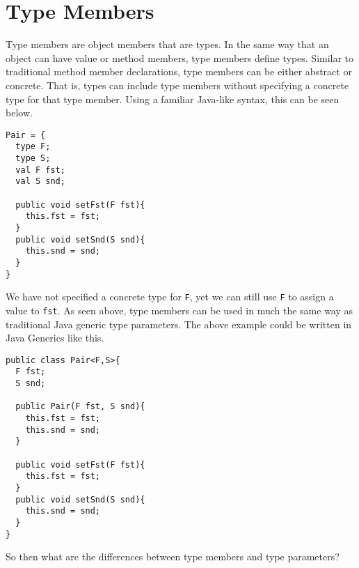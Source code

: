 \documentclass{llncs}
\numberwithin{subcase}{casethm}
\numberwithin{casethm}{theorem}
\numberwithin{casethm}{lemma}
\begin{document}
\section{Type Members}
Type members are object members that are types. 
In the same way that an object can have value or 
method members, type members define types. Similar 
to traditional method member declarations, type 
members can be either abstract or concrete. That is, 
types can include type members without specifying 
a concrete type for that type member. Using a 
familiar Java-like syntax, this can be seen below.
\begin{lstlisting}[mathescape, style=custom_lang]
Pair = {
  type F;
  type S;
  val F fst;
  val S snd;

  public void setFst(F fst){
    this.fst = fst;
  }
  public void setSnd(S snd){
    this.snd = snd;
  }
}
\end{lstlisting}
We have not specified a concrete type for \texttt{F},
yet we can still use \texttt{F} to assign a value to 
\texttt{fst}.
As seen above, type members 
can be used in much the same way as traditional Java 
generic type parameters. The above example could be 
written in Java Generics like this.
\begin{lstlisting}[mathescape, style=custom_lang]
public class Pair<F,S>{
  F fst;
  S snd;

  public Pair(F fst, S snd){
    this.fst = fst;
    this.snd = snd;
  }

  public void setFst(F fst){
    this.fst = fst;
  }
  public void setSnd(S snd){
    this.snd = snd;
  }
}
\end{lstlisting}
So then what are the differences between type members 
and type parameters?
\end{document}
